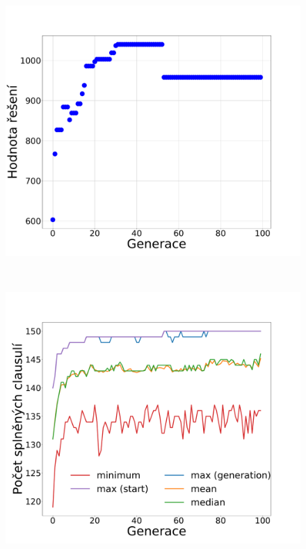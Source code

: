 \documentclass[11pt]{article}
\begin{document}
\begin{figure}
\begin{minipage}[c]{0.325\textwidth}
        \centering \includegraphics[width=\textwidth]{img/1w.pdf} 
    \end{minipage}
    \\
    \begin{minipage}[c]{0.49\textwidth}
        \centering \includegraphics[width=\textwidth]{img/1c.pdf} 
    \end{minipage}
    \begin{minipage}[c]{0.49\textwidth}

\end{minipage}
\end{figure}
\end{document}
